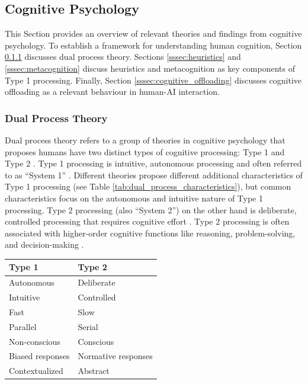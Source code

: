 \subsection{Cognitive Psychology} \label{ssec:cognitive_psychology}

This Section provides an overview of relevant theories and findings from cognitive psychology. To establish a framework for understanding human cognition, Section \ref{sssec:dual_process} discusses dual process theory. Sections \ref{sssec:heuristics} and \ref{sssec:metacognition} discuss heuristics and metacognition as key components of Type 1 processing. Finally, Section \ref{sssec:cognitive_offloading} discusses cognitive offloading as a relevant behaviour in human-AI interaction.

\subsubsection{Dual Process Theory} \label{sssec:dual_process}

Dual process theory refers to a group of theories in cognitive psychology that proposes humans have two distinct types of cognitive processing: Type 1 and Type 2 \parencite{Evans2013}. Type 1 processing is intuitive, autonomous processing and often referred to as “System 1” \parencite{Kahneman2011}. Different theories propose different additional characteristics of Type 1 processing (see Table \ref{tab:dual_process_characteristics}), but common characteristics focus on the autonomous and intuitive nature of Type 1 processing. Type 2 processing (also “System 2”) on the other hand is deliberate, controlled processing that requires cognitive effort \parencite{Evans2013}. Type 2 processing is often associated with higher-order cognitive functions like reasoning, problem-solving, and decision-making \parencite{Kahneman2011}.

\begin{ctable}
    \begin{tabular}{l|l}
        \textbf{Type 1} & \textbf{Type 2} \\
        \hline
        Autonomous & Deliberate \\
        Intuitive & Controlled \\
        \hline
        Fast & Slow \\
        Parallel & Serial \\
        Non-conscious & Conscious \\
        Biased responses & Normative responses \\
        Contextualized & Abstract \\
    \end{tabular}
    \caption[Type 1 and Type 2 Characteristics]{Common characteristics of Type 1 and Type 2 processing in dual process theories \parencite{Evans2013}}
    \label{tab:dual_process_characteristics}
\end{ctable}

